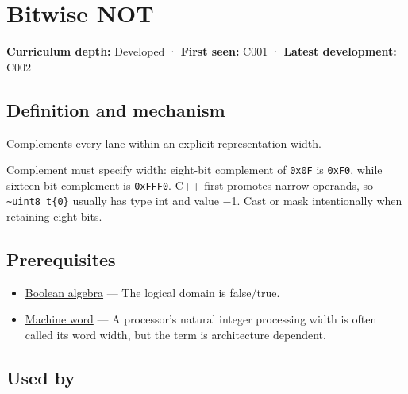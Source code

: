 \hypertarget{appendix-8f38927cfc54}{}\label{referencestart:appendix-8f38927cfc54}
\section{Bitwise NOT}\label{appendix-8f38927cfc54-bitwise-not}

\hypertarget{appendix-8f38927cfc54-bitwise-not}{}

\textbf{Curriculum depth:} Developed · \textbf{First seen:} C001 · \textbf{Latest development:} C002

\begin{allmightroledefinition}

\subsection{Definition and mechanism}\label{appendix-8f38927cfc54-definition-and-mechanism}

\hypertarget{appendix-8f38927cfc54-definition-and-mechanism}{}

Complements every lane within an explicit representation width.

\end{allmightroledefinition}

Complement must specify width: eight-bit complement of \texttt{0x0F} is \texttt{0xF0}, while sixteen-bit complement is \texttt{0xFFF0}. C++ first promotes narrow operands, so \texttt{\textasciitilde{}uint8\_t\{0\}} usually has type int and value −1. Cast or mask intentionally when retaining eight bits.

\subsection{Prerequisites}\label{appendix-8f38927cfc54-prerequisites}

\hypertarget{appendix-8f38927cfc54-prerequisites}{}

\begin{itemize}
\tightlist
\item
  \hyperref[appendix-24475e1596a8]{Boolean algebra} --- The logical domain is false/true.
\item
  \hyperref[appendix-d67a19507dc5]{Machine word} --- A processor's natural integer processing width is often called its word width, but the term is architecture dependent.
\end{itemize}

\subsection{Used by}\label{appendix-8f38927cfc54-used-by}

